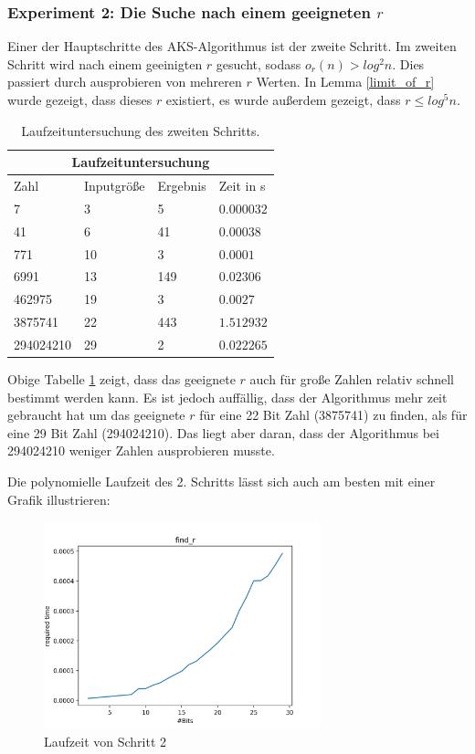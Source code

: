 \documentclass[12pt,oneside]{article}
\theoremstyle{remark}
\theoremstyle{definition}
\begin{document}
\newpage

\subsubsection{Experiment 2: Die Suche nach einem geeigneten $r$}
Einer der Hauptschritte des AKS-Algorithmus ist der zweite Schritt. Im zweiten Schritt wird nach einem geeinigten $r$ gesucht, sodass $o_r(n) > log^2 n$. Dies passiert durch ausprobieren von mehreren $r$ Werten. In Lemma \ref{limit_of_r} wurde gezeigt, dass dieses $r$ existiert, es wurde außerdem gezeigt, dass $r \leq log^5 n$.  
\begin{table}[h!]
\centering
\begin{tabular}{ |p{3cm}||p{3cm}|p{3cm}|p{3cm}|  }
 \hline
 \multicolumn{4}{|c|}{Laufzeituntersuchung} \\
 \hline
 Zahl & Inputgröße &Ergebnis&Zeit in s\\
 \hline
 7   & 3    &5&   $0.000032$\\
 41&   6  & 41   &$0.00038$\\
 771 &10 & 3&  $0.0001$\\
 6991    &13 & 149&  $0.02306$\\
 462975&   19  & 3&$ 0.0027$\\
 3875741& 22  & 443   &$1.512932$\\
 294024210& 29  & 2&$0.022265$\\
 \hline
\end{tabular}
 \caption{Laufzeituntersuchung des zweiten Schritts.}
\label{table:2}
\end{table}

Obige Tabelle \ref{table:2} zeigt, dass das geeignete $r$ auch für große Zahlen relativ schnell bestimmt werden kann. Es ist jedoch auffällig, dass der Algorithmus mehr zeit gebraucht hat um das geeignete $r$ für eine 22 Bit Zahl (3875741) zu finden, als für eine 29 Bit Zahl (294024210). Das liegt aber daran, dass der Algorithmus bei 294024210 weniger Zahlen ausprobieren musste.

Die polynomielle Laufzeit des 2. Schritts lässt sich auch am besten mit einer Grafik illustrieren:
\begin{figure}[h]
\includegraphics[width=8cm]{plots/findR.png}
\centering
\caption{Laufzeit von Schritt 2}
\end{figure}
\end{document}
